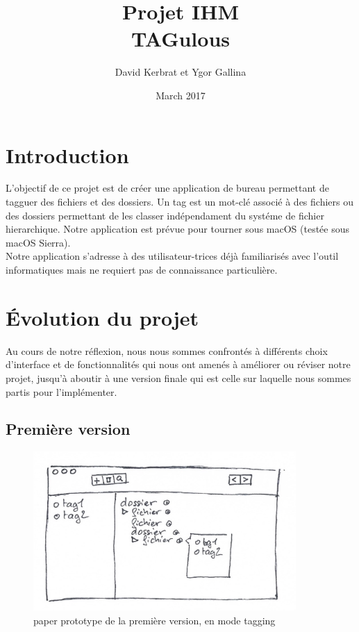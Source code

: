 \documentclass{report}
\title{Projet IHM \\ TAGulous}
\author{David Kerbrat et Ygor Gallina}
\date{March 2017}
\begin{document}
\maketitle

\tableofcontents

\chapter{Introduction}

    L'objectif de ce projet est de créer une application de bureau permettant de tagguer des fichiers et des dossiers. Un tag est un mot-clé associé à des fichiers ou des dossiers permettant de les classer indépendament du systéme de fichier hierarchique. Notre application est prévue pour tourner sous macOS (testée sous macOS Sierra).\\
    
    Notre application s'adresse à des utilisateur-trices déjà familiarisés avec l'outil informatiques mais ne requiert pas de connaissance particulière.\\

\chapter{Évolution du projet}

    Au cours de notre réflexion, nous nous sommes confrontés à différents choix d'interface et de fonctionnalités qui nous ont amenés à améliorer ou réviser notre projet, jusqu'à aboutir à une version finale qui est celle sur laquelle nous sommes partis pour l'implémenter.

    \section{Première version}
            \begin{figure}[htbp]
            \begin{center}
                \includegraphics[width=10cm]{version1.jpg}
                \caption{paper prototype de la première version, en mode tagging}
                \end{center}
            \end{figure}
\end{document}
